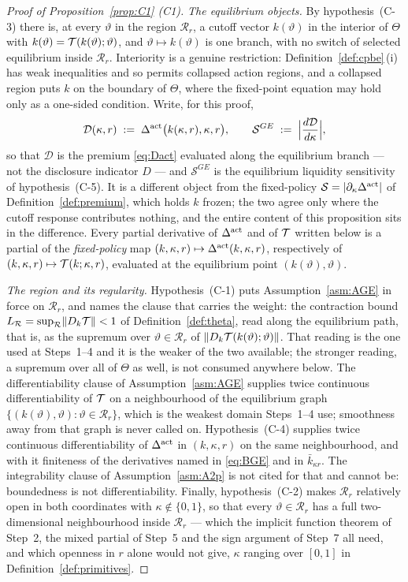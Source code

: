 \begin{proof}[Proof of Proposition~\ref{prop:C1} (C1)]
\emph{The equilibrium objects.} By hypothesis~(C-3) there is, at every $\vartheta$ in the region
$\mathcal R_r$, a cutoff vector $k(\vartheta)$ in the interior of $\Theta$ with
$k(\vartheta) = \mathcal{T}(k(\vartheta);\vartheta)$, and $\vartheta\mapsto k(\vartheta)$ is one branch,
with no switch of selected equilibrium inside $\mathcal R_r$. Interiority is a genuine restriction:
Definition~\ref{def:cpbe}\,(i) has weak inequalities and so permits collapsed action regions, and a
collapsed region puts $k$ on the boundary of $\Theta$, where the fixed-point equation may hold only
as a one-sided condition. Write, for this proof,
\[
\mathcal D(\kappa,r) \;:=\; \Delta^{\mathrm{act}}\bigl(k(\kappa,r),\kappa,r\bigr),
\qquad
\mathcal S^{GE} \;:=\; \Bigl\lvert \frac{d\mathcal D}{d\kappa} \Bigr\rvert ,
\]
so that $\mathcal D$ is the premium \eqref{eq:Dact} evaluated along the equilibrium branch --- not
the disclosure indicator $D$ --- and $\mathcal S^{GE}$ is the equilibrium liquidity sensitivity of
hypothesis~(C-5). It is a different object from the fixed-policy $\mathcal S = |\partial_\kappa\Delta^{\mathrm{act}}|$
of Definition~\ref{def:premium}, which holds $k$ frozen; the two agree only where the cutoff
response contributes nothing, and the entire content of this proposition sits in the difference.
Every partial derivative of $\Delta^{\mathrm{act}}$ and of $\mathcal{T}$ written below is a partial of the
\emph{fixed-policy} map $(k,\kappa,r)\mapsto\Delta^{\mathrm{act}}(k,\kappa,r)$, respectively of
$(k,\kappa,r)\mapsto\mathcal{T}(k;\kappa,r)$, evaluated at the equilibrium point
$(k(\vartheta),\vartheta)$.

\emph{The region and its regularity.} Hypothesis~(C-1) puts Assumption~\ref{asm:AGE} in force on
$\mathcal R_r$, and names the clause that carries the weight: the contraction bound
$L_{\mathcal R} = \sup_{\mathcal R}\lVert D_k\mathcal{T}\rVert < 1$ of Definition~\ref{def:theta}, read
along the equilibrium path, that is, as the supremum over $\vartheta \in \mathcal R_r$ of
$\lVert D_k\mathcal{T}(k(\vartheta);\vartheta)\rVert$. That reading is the one used at Steps~1--4 and it
is the weaker of the two available; the stronger reading, a supremum over all of $\Theta$ as well,
is not consumed anywhere below. The differentiability clause of Assumption~\ref{asm:AGE} supplies
twice continuous differentiability of $\mathcal{T}$ on a neighbourhood of the equilibrium graph
$\{(k(\vartheta),\vartheta) : \vartheta\in\mathcal R_r\}$, which is the weakest domain Steps~1--4
use; smoothness away from that graph is never called on. Hypothesis~(C-4) supplies twice continuous
differentiability of $\Delta^{\mathrm{act}}$ in $(k,\kappa,r)$ on the same neighbourhood, and with it finiteness of
the derivatives named in \eqref{eq:BGE} and in $\bar k_{\kappa r}$. The integrability clause of
Assumption~\ref{asm:A2p} is not cited for that and cannot be: boundedness is not differentiability.
Finally, hypothesis~(C-2) makes $\mathcal R_r$ relatively open in both coordinates with
$\kappa\notin\{0,1\}$, so that every $\vartheta\in\mathcal R_r$ has a full two-dimensional
neighbourhood inside $\mathcal R_r$ --- which the implicit function theorem of Step~2, the mixed
partial of Step~5 and the sign argument of Step~7 all need, and which openness in $r$ alone would
not give, $\kappa$ ranging over $[0,1]$ in Definition~\ref{def:primitives}.


\end{proof}

